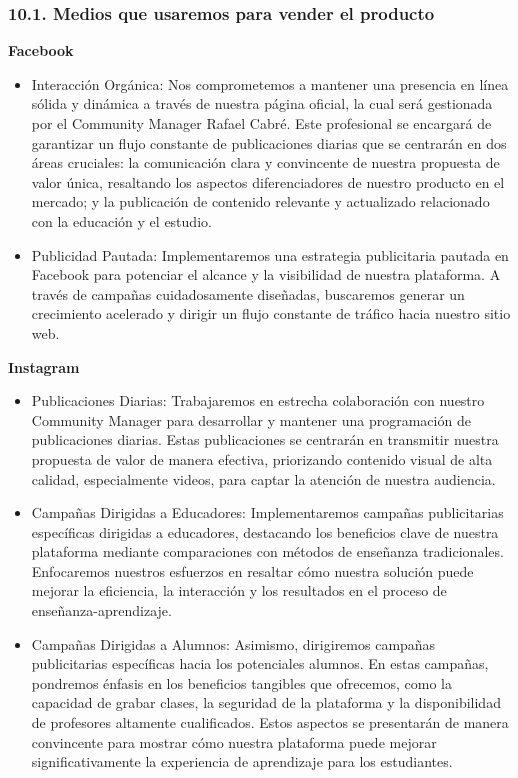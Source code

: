 \documentclass[
]{article}
\providecommand{\tightlist}{%
  \setlength{\itemsep}{0pt}\setlength{\parskip}{0pt}}
\begin{document}
\subsubsection{10.1. Medios que usaremos para vender el
producto}\label{medios-que-usaremos-para-vender-el-producto}

\textbf{Facebook}

\begin{itemize}
\tightlist
\item
  Interacción Orgánica: Nos comprometemos a mantener una presencia en
  línea sólida y dinámica a través de nuestra página oficial, la cual
  será gestionada por el Community Manager Rafael Cabré. Este
  profesional se encargará de garantizar un flujo constante de
  publicaciones diarias que se centrarán en dos áreas cruciales: la
  comunicación clara y convincente de nuestra propuesta de valor única,
  resaltando los aspectos diferenciadores de nuestro producto en el
  mercado; y la publicación de contenido relevante y actualizado
  relacionado con la educación y el estudio.
\item
  Publicidad Pautada: Implementaremos una estrategia publicitaria
  pautada en Facebook para potenciar el alcance y la visibilidad de
  nuestra plataforma. A través de campañas cuidadosamente diseñadas,
  buscaremos generar un crecimiento acelerado y dirigir un flujo
  constante de tráfico hacia nuestro sitio web.
\end{itemize}

\textbf{Instagram}

\begin{itemize}
\tightlist
\item
  Publicaciones Diarias: Trabajaremos en estrecha colaboración con
  nuestro Community Manager para desarrollar y mantener una programación
  de publicaciones diarias. Estas publicaciones se centrarán en
  transmitir nuestra propuesta de valor de manera efectiva, priorizando
  contenido visual de alta calidad, especialmente videos, para captar la
  atención de nuestra audiencia.
\item
  Campañas Dirigidas a Educadores: Implementaremos campañas
  publicitarias específicas dirigidas a educadores, destacando los
  beneficios clave de nuestra plataforma mediante comparaciones con
  métodos de enseñanza tradicionales. Enfocaremos nuestros esfuerzos en
  resaltar cómo nuestra solución puede mejorar la eficiencia, la
  interacción y los resultados en el proceso de enseñanza-aprendizaje.
\item
  Campañas Dirigidas a Alumnos: Asimismo, dirigiremos campañas
  publicitarias específicas hacia los potenciales alumnos. En estas
  campañas, pondremos énfasis en los beneficios tangibles que ofrecemos,
  como la capacidad de grabar clases, la seguridad de la plataforma y la
  disponibilidad de profesores altamente cualificados. Estos aspectos se
  presentarán de manera convincente para mostrar cómo nuestra plataforma
  puede mejorar significativamente la experiencia de aprendizaje para
  los estudiantes.
\end{itemize}
\end{document}
